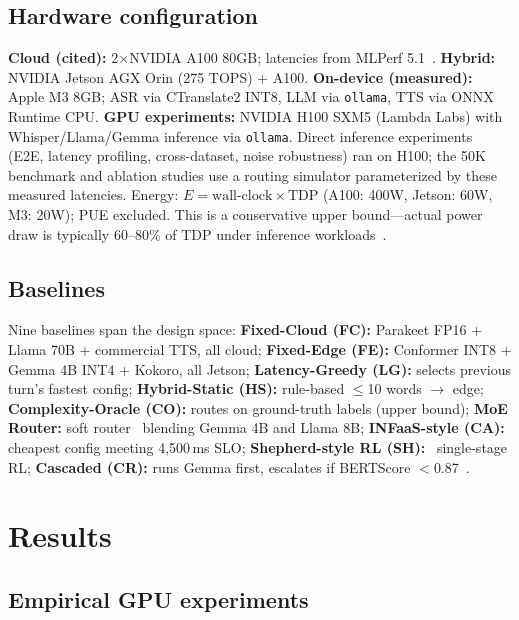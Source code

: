 \documentclass{article}
\begin{document}
\subsection{Hardware configuration}

\textbf{Cloud (cited):} 2$\times$NVIDIA A100 80GB; latencies from MLPerf 5.1~\citep{mlperf2025}. \textbf{Hybrid:} NVIDIA Jetson AGX Orin (275 TOPS) + A100. \textbf{On-device (measured):} Apple M3 8GB; ASR via CTranslate2 INT8, LLM via \texttt{ollama}, TTS via ONNX Runtime CPU. \textbf{GPU experiments:} NVIDIA H100 SXM5 (Lambda Labs) with Whisper/Llama/Gemma inference via \texttt{ollama}. Direct inference experiments (E2E, latency profiling, cross-dataset, noise robustness) ran on H100; the 50K benchmark and ablation studies use a routing simulator parameterized by these measured latencies. Energy: $E = \text{wall-clock} \times \text{TDP}$ (A100: 400W, Jetson: 60W, M3: 20W); PUE excluded. This is a conservative upper bound---actual power draw is typically 60--80\% of TDP under inference workloads~\citep{strubell2019energy}.

\subsection{Baselines}
\label{sec:baselines}

Nine baselines span the design space: \textbf{Fixed-Cloud (FC):} Parakeet FP16 + Llama 70B + commercial TTS, all cloud; \textbf{Fixed-Edge (FE):} Conformer INT8 + Gemma 4B INT4 + Kokoro, all Jetson; \textbf{Latency-Greedy (LG):} selects previous turn's fastest config; \textbf{Hybrid-Static (HS):} rule-based $\leq$10 words $\to$ edge; \textbf{Complexity-Oracle (CO):} routes on ground-truth labels (upper bound); \textbf{MoE Router:} soft router~\citep{shazeer2017moe} blending Gemma 4B and Llama 8B; \textbf{INFaaS-style (CA):}~\citep{romero2021infaas} cheapest config meeting 4{,}500\,ms SLO; \textbf{Shepherd-style RL (SH):}~\citep{gujarati2023shepherd} single-stage RL; \textbf{Cascaded (CR):} runs Gemma first, escalates if BERTScore $<$0.87~\citep{snell2024scaling}.

\section{Results}
\label{sec:results}

\subsection{Empirical GPU experiments}
\label{sec:gpu}
\end{document}
